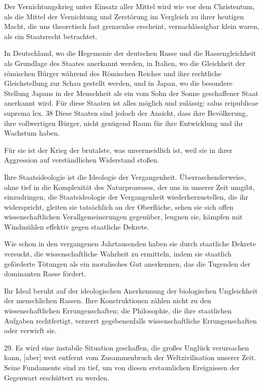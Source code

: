 \documentclass[11pt,a4paper]{book}
\begin{document}
Der Vernichtungskrieg unter Einsatz aller Mittel wird wie vor dem Christentum, als die Mittel der Vernichtung und Zerstörung im Vergleich zu ihrer heutigen Macht, die uns theoretisch fast grenzenlos erscheint, vernachlässigbar klein waren, als ein Staatsrecht betrachtet. 

In Deutschland, wo die Hegemonie der deutschen Rasse und die Rassengleichheit als Grundlage des Staates anerkannt werden, in Italien, wo die Gleichheit der römischen Bürger während des Römischen Reiches und ihre rechtliche Gleichstellung zur Schau gestellt werden, und in Japan, wo die besondere Stellung Japans in der Menschheit als ein vom Sohn der Sonne geschaffener Staat anerkannt wird. Für diese Staaten ist alles möglich und zulässig: salus reipublicae suprema lex. 38 Diese Staaten sind jedoch der Ansicht, dass ihre Bevölkerung, ihre vollwertigen Bürger, nicht genügend Raum für ihre Entwicklung und ihr Wachstum haben. 

Für sie ist der Krieg der brutalste, was unvermeidlich ist, weil sie in ihrer Aggression auf verständlichen Widerstand stoßen. 

Ihre Staatsideologie ist die Ideologie der Vergangenheit. Überraschenderweise, ohne tief in die Komplexität des Naturprozesses, der uns in unserer Zeit umgibt, einzudringen, die Staatsideologie der Vergangenheit wiederherzustellen, die ihr widerspricht, gleiten sie tatsächlich an der Oberfläche, sehen sie sich offen wissenschaftlichen Verallgemeinerungen gegenüber, leugnen sie, kämpfen mit Windmühlen effektiv gegen staatliche Dekrete. 

Wie schon in den vergangenen Jahrtausenden haben sie durch staatliche Dekrete versucht, die wissenschaftliche Wahrheit zu ermitteln, indem sie staatlich geförderte Tötungen als ein moralisches Gut anerkennen, das die Tugenden der dominanten Rasse fördert. 

Ihr Ideal beruht auf der ideologischen Anerkennung der biologischen Ungleichheit der menschlichen Rassen. Ihre Konstruktionen zählen nicht zu den wissenschaftlichen Errungenschaften; die Philosophie, die ihre staatlichen Aufgaben rechtfertigt, verzerrt gegebenenfalls wissenschaftliche Errungenschaften oder verwirft sie. 

29. Es wird eine instabile Situation geschaffen, die großes Unglück verursachen kann, [aber] weit entfernt vom Zusammenbruch der Weltzivilisation unserer Zeit. Seine Fundamente sind zu tief, um von diesen erstaunlichen Ereignissen der Gegenwart erschüttert zu werden. 
\end{document}
